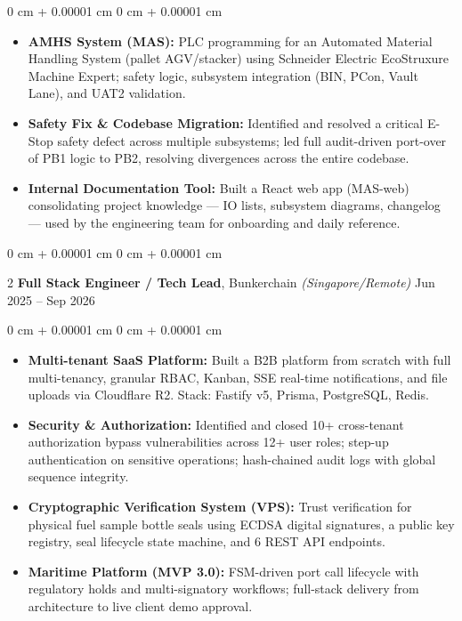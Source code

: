 \documentclass[10pt, letterpaper]{article}
\newenvironment{highlights}{ \begin{itemize}[ topsep=0.10 cm, parsep=0.10 cm, partopsep=0pt,
itemsep=0pt, leftmargin=0 cm + 10pt ] }{ \end{itemize} }
\newenvironment{onecolentry}{ \begin{adjustwidth}{ 0 cm + 0.00001 cm }{ 0 cm + 0.00001 cm }
}{ \end{adjustwidth} }
\newenvironment{twocolentry}[2][]{ \onecolentry \def\secondColumn{#2} \setcolumnwidth{\fill, 4.5 cm}
\begin{paracol}{2} }{ \switchcolumn \raggedleft \secondColumn \end{paracol}
\endonecolentry }
\begin{document}
	\vspace{0.10 cm}
	\begin{onecolentry}
		\begin{highlights}
			\item \textbf{AMHS System (MAS):} PLC programming for an Automated Material Handling System (pallet AGV/stacker) using Schneider Electric EcoStruxure Machine Expert; safety logic, subsystem integration (BIN, PCon, Vault Lane), and UAT2 validation.
			\item \textbf{Safety Fix \& Codebase Migration:} Identified and resolved a critical E-Stop safety defect across multiple subsystems; led full audit-driven port-over of PB1 logic to PB2, resolving divergences across the entire codebase.
			\item \textbf{Internal Documentation Tool:} Built a React web app (MAS-web) consolidating project knowledge --- IO lists, subsystem diagrams, changelog --- used by the engineering team for onboarding and daily reference.
		\end{highlights}
	\end{onecolentry}

	\vspace{0.2 cm}

	\begin{twocolentry}
		{ Jun 2025 -- Sep 2026 } \textbf{Full Stack Engineer / Tech Lead}, Bunkerchain \textit{(Singapore/Remote)}
	\end{twocolentry}

	\vspace{0.10 cm}
	\begin{onecolentry}
		\begin{highlights}
			\item \textbf{Multi-tenant SaaS Platform:} Built a B2B platform from scratch with full multi-tenancy, granular RBAC, Kanban, SSE real-time notifications, and file uploads via Cloudflare R2. Stack: Fastify v5, Prisma, PostgreSQL, Redis.
			\item \textbf{Security \& Authorization:} Identified and closed 10+ cross-tenant authorization bypass vulnerabilities across 12+ user roles; step-up authentication on sensitive operations; hash-chained audit logs with global sequence integrity.
			\item \textbf{Cryptographic Verification System (VPS):} Trust verification for physical fuel sample bottle seals using ECDSA digital signatures, a public key registry, seal lifecycle state machine, and 6 REST API endpoints.
			\item \textbf{Maritime Platform (MVP 3.0):} FSM-driven port call lifecycle with regulatory holds and multi-signatory workflows; full-stack delivery from architecture to live client demo approval.
		\end{highlights}
	\end{onecolentry}
\end{document}
